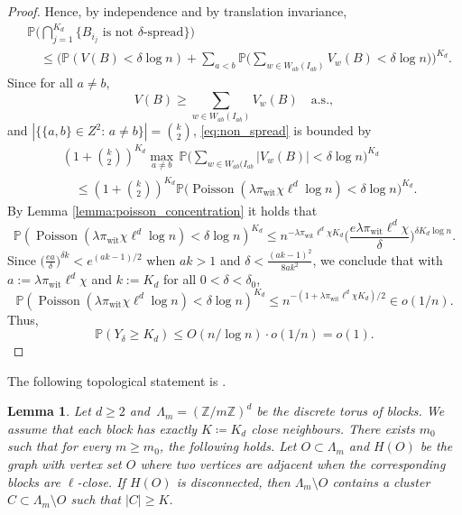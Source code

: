 \documentclass[11pt, a4paper]{amsart}
\newtheorem{lemma}[theorem]{Lemma}
\newcommand{\1}{\mathbf{1}}
\theoremstyle{definition}
\theoremstyle{remark}
\theoremstyle{definition}
\begin{document}
\begin{proof}
Hence, by independence and by translation invariance,
\begin{align}
    &\mathbb{P}\Big(\bigcap_{j=1}^{K_d}\{B_{i_j}\text{ is not }\delta\text{-spread}\}\Big)\nonumber\\   &\quad\leq \Big(\mathbb{P}\left(V(B)<\delta\log n\right) + \sum_{a< b} \mathbb{P}\Big(\sum_{w\in W_{ab}(I_{ab})}V_w(B)<\delta\log n\Big) \Big)^{K_d}.\label{eq:non_spread}
\end{align}
Since for all $a \neq b$,
$$
    V(B) \ge  \sum_{w\in W_{ab}(I_{ab})}V_w(B) \quad \text{a.s.},
$$
and $|\{\{a,b\}\in Z^2:\,a \neq b\}|=\binom k2$, \eqref{eq:non_spread} is bounded by
\begin{align*}
&\left(1+\binom{k}{2}\right)^{K_d}
\max_{a\neq b}\, 
\mathbb{P}\Big(
\sum_{w\in W_{ab}(I_{ab}} |V_w(B)|
<\delta\log n
\Big)^{K_d}\\
&\quad \le \left(1+\binom{k}{2}\right)^{K_d}\mathbb{P}\Big(\operatorname{Poisson}(\lambda \pi_{\mathrm{wit}}\chi \ell^d\log n)<\delta\log n\Big)^{K_d}.
\end{align*}
By Lemma \ref{lemma:poisson_concentration} it holds that
$$
\mathbb{P}\left(\operatorname{Poisson}(\lambda \pi_{\mathrm{wit}}\chi \ell^d\log n)<\delta\log n\right)^{K_d} \le n^{-\lambda \pi_{\mathrm{wit}}\ell^d \chi K_d}
\Big(\frac{e \lambda \pi_{\mathrm{wit}}\ell^d \chi}{\delta}\Big)^{\delta K_d\log n}.
$$
Since $\big(\frac{ea}{\delta}\big)^{\delta k}<e^{(ak-1)/2}$ when $ak>1$ and $\delta < \frac{(ak-1)^2}{8ak^2}$, we conclude that with $a:=\lambda \pi_{\mathrm{wit}} \ell^d \chi$ and $k:=K_d$ for all $0<\delta <\delta_0$,
$$
\mathbb{P}\left(\operatorname{Poisson}(\lambda \pi_{\mathrm{wit}}\chi \ell^d\log n)<\delta\log n\right)^{K_d} \le n^{-(1+\lambda \pi_{\mathrm{wit}}\ell^d \chi K_d)/2} \in o(1/n).
$$
Thus,
$$\mathbb{P}(Y_\delta\geq K_d) \leq O(n/\log n) \cdot o(1/n) = o(1).$$
\end{proof}


The following topological statement is \cite[Proposition C.9]{gaudio2025incguan}.
\begin{lemma}\cite[Proposition C.9]{gaudio2025incguan}\label{lemma:geometric_boundary_cluster}
Let $d\geq 2$ and~$\Lambda_m=(\mathbb Z/m\mathbb Z)^d$ be the
discrete torus of blocks.
We assume that each block has exactly $K\coloneqq K_d$ close neighbours.
There exists $m_0$ such that for every $m\geq m_0$, the following holds. Let $O\subset\Lambda_m$ and $H(O)$ be the graph with vertex set $O$ where two vertices are adjacent when the corresponding blocks are $\ell$-close.
If $H(O)$ is disconnected, then $\Lambda_m\setminus O$ contains
a cluster $C \subset \Lambda_m\setminus O$ such that $|C|\geq K$.
\end{lemma}
\end{document}

